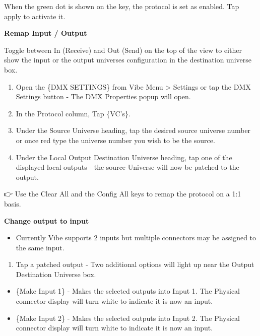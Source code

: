 \documentclass[
]{article}
\providecommand{\tightlist}{%
  \setlength{\itemsep}{0pt}\setlength{\parskip}{0pt}}
\begin{document}
When the green dot is shown on the key, the protocol is set as enabled. Tap apply to activate it.

\textbf{Remap Input / Output}

Toggle between In (Receive) and Out (Send) on the top of the view to either show the input or the output universes configuration in the destination universe box.

\begin{enumerate}
\def\labelenumi{\arabic{enumi}.}
\item
  Open the \{DMX SETTINGS\} from Vibe Menu \textgreater{} Settings or tap the DMX Settings button - The DMX Properties popup will open.
\item
  In the Protocol column, Tap \{VC's\}.
\item
  Under the Source Universe heading, tap the desired source universe number or once red type the universe number you wish to be the source.
\item
  Under the Local Output Destination Universe heading, tap one of the displayed local outputs - the source Universe will now be patched to the output.
\end{enumerate}

👉 Use the Clear All and the Config All keys to remap the protocol on a 1:1 basis.

\textbf{Change output to input}

\begin{itemize}
\tightlist
\item
  Currently Vibe supports 2 inputs but multiple connectors may be assigned to the same input.
\end{itemize}

\begin{enumerate}
\def\labelenumi{\arabic{enumi}.}
\tightlist
\item
  Tap a patched output - Two additional options will light up near the Output Destination Universe box.
\end{enumerate}

\begin{itemize}
\item
  \{Make Input 1\} - Makes the selected outputs into Input 1. The Physical connector display will turn white to indicate it is now an input.
\item
  \{Make Input 2\} - Makes the selected outputs into Input 2. The Physical connector display will turn white to indicate it is now an input.
\end{itemize}
\end{document}
